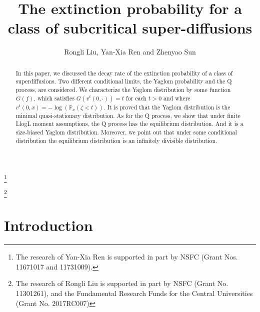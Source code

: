 \documentclass[12pt,a4paper]{amsart}
\theoremstyle{plain}
\theoremstyle{definition}
\numberwithin{equation}{section}
\begin{document}
\title
    [Subcritical super-diffusions]
    {\large The extinction probability for a class of subcritical super-diffusions}
\author
    [R. Liu, Y.-X. Ren and Z. Sun]
    { Rongli Liu, Yan-Xia Ren and Zhenyao Sun}
\address
    {Yan-Xia Ren\\
    School of Mathematical Sciences\\
    Peking University\\
    Beijing, P. R. China, 100871}
\thanks{The research of Yan-Xia Ren is supported in part by NSFC (Grant Nos. 11671017  and 11731009).}
\address
   {Rongli Liu\\
   {\bf Information about Rongli Liu}}
   \thanks{ The research of Rongli Liu is supported in part by NSFC
(Grant No. 11301261), and the Fundamental Research Funds for the Central Universities (Grant No.  2017RC007)}
\address
    {Zhenyao Sun\\
    School of Mathematical Sciences\\
    Peking University\\
    Beijing, P. R. China, 100871}
\begin{abstract}
	In this paper, we discussed the decay rate of the extinction probability of a class of superdiffusions. Two different conditional limits, the Yaglom probability and the Q process, are considered.  We characterize the Yaglom distribution by some function $G(f)$, which satisfies $G(v^t(0,\cdot))=t$ for each $t>0$ and where $v^t(0,x)=-\log(\mathbb P_x(\zeta<t))$.  It is proved that the Yaglom distribution is the minimal quasi-stationary distribution.  As for the Q process, we show that under finite LlogL moment assumptions, the Q process has the equilibrium distribution.  And it is a size-biased Yaglom distribution. Moreover, we point out that under some conditional distribution the equilibrium  distribution is an infinitely divisible distribution.
\end{abstract}
\maketitle
\section{Introduction}
\end{document}
